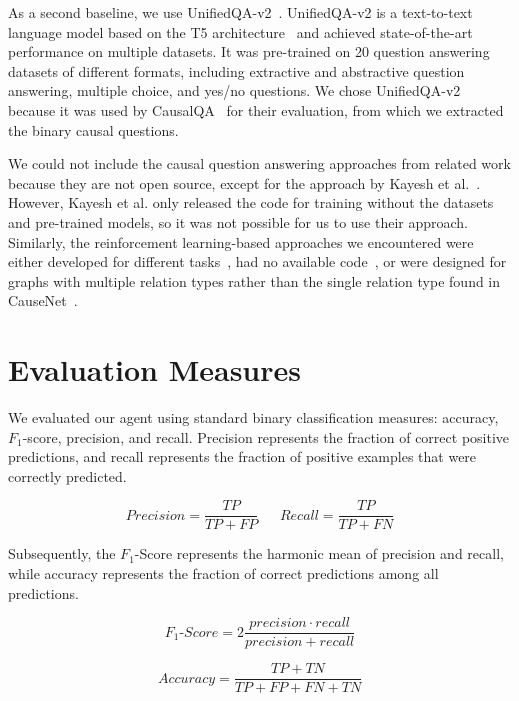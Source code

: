 As a second baseline, we use UnifiedQA-v2~\cite{Khashabi2020UnifiedQA, Khashabi2022UnifiedQA2}. 
UnifiedQA-v2 is a text-to-text language model based on the T5 architecture~\cite{Raffel2020T5}
and achieved state-of-the-art performance on multiple datasets.
It was pre-trained on 20 question answering datasets of different formats, including extractive 
and abstractive question answering, multiple choice, and yes/no questions.
We chose UnifiedQA-v2 because it was used by CausalQA~\cite{Bondarenko2022CausalQA} for their 
evaluation, from which we extracted the binary causal questions.

We could not include the causal question answering approaches from related work 
because they are not open source, except for the approach by Kayesh et al.~\cite{KayeshCausalTransfer2020}. 
However, Kayesh et al. only released the code for training without the datasets and pre-trained models, so it was not possible for us to use their approach.
Similarly, the reinforcement learning-based approaches we encountered were either 
developed for different tasks~\cite{Kaiser2021Reinforcement}, had no available code~\cite{Qiu2020Stepwise}, 
or were designed for graphs with multiple relation types rather than 
the single relation type found in CauseNet~\cite{Das2018Minerva, Lin2020RewardShaping}.

\section{Evaluation Measures}
\label{sec:measures}
We evaluated our agent using standard binary classification measures: accuracy, $F_1$-score, 
precision, and recall. Precision represents the fraction of correct positive predictions, and recall 
represents the fraction of positive examples that were correctly predicted.

\begin{equation}
	Precision = \frac{TP}{TP + FP} \ \ \ \ \ \ \ Recall = \frac{TP}{TP + FN}
\end{equation}

Subsequently, the $F_1$-Score represents the harmonic mean of precision and recall, 
while
accuracy represents the fraction of correct predictions among all predictions.

\begin{equation}
	F_1\text{-}Score = 2\frac{precision \cdot recall}{precision + recall}
\end{equation}

\begin{equation}
	Accuracy = \frac{TP + TN}{TP + FP + FN + TN}
\end{equation}

